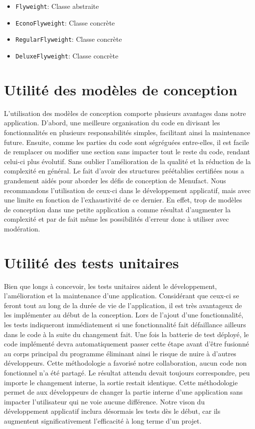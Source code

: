 \documentclass[a11paper, 11pt]{article}
\begin{document}
\begin{itemize}
  \item \verb|Flyweight|: Classe abstraite
  \item \verb|EconoFlyweight|: Classe concrète
  \item \verb|RegularFlyweight|: Classe concrète
  \item \verb|DeluxeFlyweight|: Classe concrète
\end{itemize}

\section{Utilité des modèles de conception}

L'utilisation des modèles de conception comporte plusieurs avantages dans notre application. D'abord, une meilleure organisation du code en divisant les fonctionnalités en plusieurs responsabilités simples, facilitant ainsi la maintenance future. Ensuite, comme les parties du code sont ségréguées entre-elles, il est facile de remplacer ou modifier une section sans impacter tout le reste du code, rendant celui-ci plus évolutif. Sans oublier l'amélioration de la qualité et la réduction de la complexité en général. Le fait d'avoir des structures préétablies certifiées nous a grandement aidés pour aborder les défis de conception de Menufact. Nous recommandons l'utilisation de ceux-ci dans le développement applicatif, mais avec une limite en fonction de l'exhaustivité de ce dernier. En effet, trop de modèles de conception dans une petite application a comme résultat d'augmenter la complexité et par de fait même les possibilités d'erreur donc à utiliser avec modération.\\

\section{Utilité des tests unitaires}

Bien que longs à concevoir, les tests unitaires aident le développement, l'amélioration et la maintenance d'une application. Considérant que ceux-ci se feront tout au long de la durée de vie de l'application, il est très avantageux de les implémenter au début de la conception. Lors de l'ajout d'une fonctionnalité, les tests indiqueront immédiatement si une fonctionnalité fait défaillance ailleurs dans le code à la suite du changement fait. Une fois la batterie de test déployé, le code implémenté devra automatiquement passer cette étape avant d'être fusionné au corps principal du programme éliminant ainsi le risque de nuire à d'autres développeurs. Cette méthodologie a favorisé notre collaboration, aucun code non fonctionnel n'a été partagé. Le résultat attendu devait toujours correspondre, peu importe le changement interne, la sortie restait identique. Cette méthodologie permet de aux développeurs de changer la partie interne d'une application sans impacter l'utilisateur qui ne voie aucune différence. Notre vison du développement applicatif inclura désormais les tests dès le début, car ils augmentent significativement l'efficacité à long terme d'un projet.\\
\end{document}
